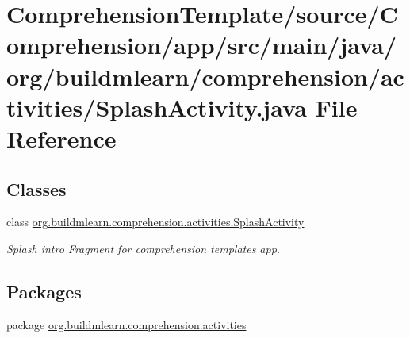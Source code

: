\hypertarget{ComprehensionTemplate_2source_2Comprehension_2app_2src_2main_2java_2org_2buildmlearn_2comprehensda8a92fcd13a48c8e60cae30156cb02e}{}\section{Comprehension\+Template/source/\+Comprehension/app/src/main/java/org/buildmlearn/comprehension/activities/\+Splash\+Activity.java File Reference}
\label{ComprehensionTemplate_2source_2Comprehension_2app_2src_2main_2java_2org_2buildmlearn_2comprehensda8a92fcd13a48c8e60cae30156cb02e}
\subsection*{Classes}
\begin{DoxyCompactItemize}
\item 
class \hyperlink{classorg_1_1buildmlearn_1_1comprehension_1_1activities_1_1SplashActivity}{org.\+buildmlearn.\+comprehension.\+activities.\+Splash\+Activity}
\begin{DoxyCompactList}\small\item\em Splash intro Fragment for comprehension template\textquotesingle{}s app. \end{DoxyCompactList}\end{DoxyCompactItemize}
\subsection*{Packages}
\begin{DoxyCompactItemize}
\item 
package \hyperlink{namespaceorg_1_1buildmlearn_1_1comprehension_1_1activities}{org.\+buildmlearn.\+comprehension.\+activities}
\end{DoxyCompactItemize}
